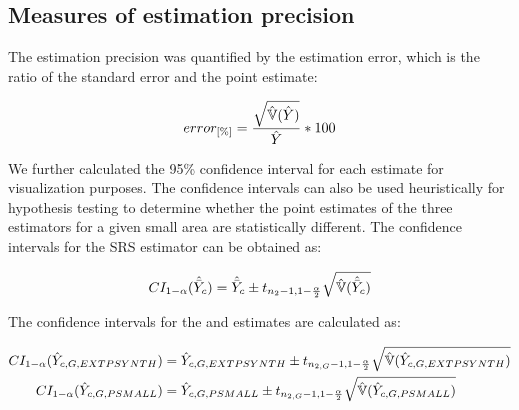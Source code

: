 \subsection{Measures of estimation precision}

The estimation precision was quantified by the estimation error, which is the ratio of the standard error and the point estimate:

\begin{equation}\label{eq:error}
error_{[\%]}=\frac{\sqrt{\hat{\mathbb{V}}(\hat{Y})}}{\hat{Y}}*100
\end{equation}

We further calculated the 95\% confidence interval for each estimate for visualization purposes. The confidence intervals can also be used heuristically for hypothesis testing to determine whether the point estimates of the three estimators for a given small area are statistically different. The confidence intervals for the SRS estimator can be obtained as:


\begin{equation}\label{ci_1phase}
CI_{1-\alpha}(\hat{\bar{Y}}_c)=\hat{\bar{Y}}_c \pm t_{n_{2}-1, 1-\frac{\alpha}{2}}\sqrt{\hat{\mathbb{V}}(\hat{\bar{Y}}_c)}
\end{equation}


The confidence intervals for the \psmall{} and \extpsynth{} estimates are calculated as:


\begin{subequations}\label{ci_2phase_sae}
	\begin{align}
CI_{1-\alpha}(\hat{Y}_{c,G,EXTPSYNTH})&=\hat{Y}_{c,G,EXTPSYNTH} \pm t_{n_{2,G}-1, 1-\frac{\alpha}{2}}\sqrt{\hat{\mathbb{V}}(\hat{Y}_{c,G,EXTPSYNTH})} \\
CI_{1-\alpha}(\hat{Y}_{c,G,PSMALL})&=\hat{Y}_{c,G,PSMALL} \pm t_{n_{2,G}-1, 1-\frac{\alpha}{2}}\sqrt{\hat{\mathbb{V}}(\hat{Y}_{c,G,PSMALL})}
	\end{align}
\end{subequations}



